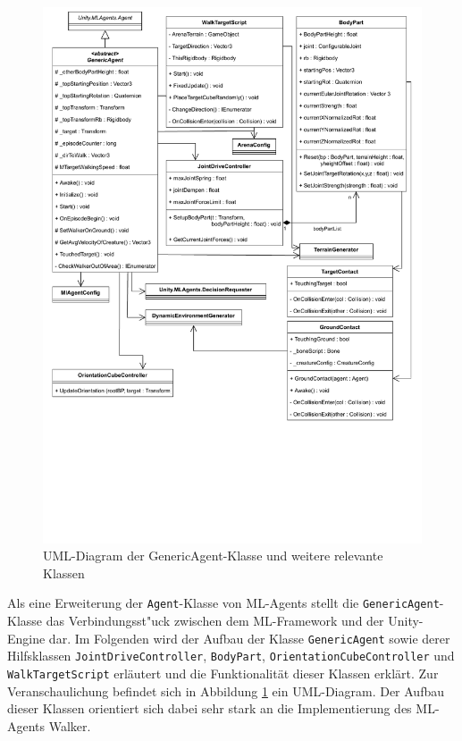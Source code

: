 \begin{figure}
	\includegraphics[width=\textwidth, trim={0cm 6.5cm 0cm 0cm}, clip]{resources/img/PG_Agent.drawio.pdf}
	\caption{UML-Diagram der GenericAgent-Klasse und weitere relevante Klassen}
	\label{fig:umlAgent}
\end{figure}

Als eine Erweiterung der \texttt{Agent}-Klasse von ML-Agents stellt die \texttt{GenericAgent}-Klasse das Verbindungsst"uck zwischen dem ML-Framework und der Unity-Engine dar. Im Folgenden wird der Aufbau der Klasse \texttt{GenericAgent} sowie derer Hilfsklassen \texttt{JointDrive\-Controller}, \texttt{BodyPart}, \texttt{OrientationCubeController} und \texttt{WalkTargetScript} erläutert und die Funktionalität dieser Klassen erklärt. Zur Veranschaulichung befindet sich in Abbildung \ref{fig:umlAgent} ein UML-Diagram. Der Aufbau dieser Klassen orientiert sich dabei sehr stark an die Implementierung des ML-Agents Walker.


